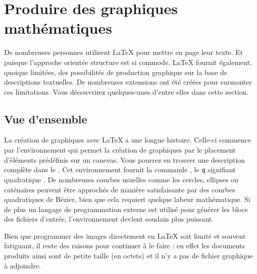 

\setcounter{chapter}{4}
\newcommand{\graphicscompanion}{\emph{The \LaTeX{} Graphics Companion}~\cite{graphicscompanion}}
\newcommand{\hobby}{\emph{A User's Manual for \MP{}}~\cite{metapost}}
\newcommand{\hoenig}{\emph{\TeX{} Unbound}~\cite{unbound}}
\newcommand{\graphicsinlatex}{\emph{Graphics in \LaTeXe{}}~\cite{ursoswald}}

\chapter{Produire des graphiques mathématiques}
\label{chap:graphics}

\begin{intro}
De nombreuses personnes utilisent \LaTeX{} pour mettre en page leur
texte. Et puisque l'approche \og orientée structure \fg{} est si
commode, \LaTeX{} fournit également, quoique limitées, des
possibilités de production graphique sur la base de descriptions
textuelles. De nombreuses extensions ont été créées pour surmonter ces
limitations. Vous découvrirez quelques-unes d'entre elles dans cette
section.
\end{intro}

\section{Vue d'ensemble}

La création de graphiques avec \LaTeX{} a une longue
histoire. Celle-ci commence par l'environnement  qui
permet la création de graphiques par le placement d'éléments
prédéfinis sur un canevas. Vous pourrez en trouver une description
complète dans le \manual. Cet environnement fournit la commande
, le \og \texttt{q} \fg signifiant \og quadratique \fg. De nombreuses
courbes usuelles comme les cercles, ellipses ou caténaires peuvent
être approchés de manière satisfaisante par des courbes quadratiques
de Bézier, bien que cela requiert quelque labeur mathématique. Si de
plus un langage de programmation externe est utilisé pour générer
les blocs  des fichiers d'entrée, l'environnement
 devient soudain plus puissant.

Bien que programmer des images directement en \LaTeX{} soit limité et
souvent fatiguant, il reste des raisons pour continuer à le faire : en
effet les documents produits ainsi sont de petite taille (en octets)
et il n'y a pas de fichier graphique à adjoindre.

